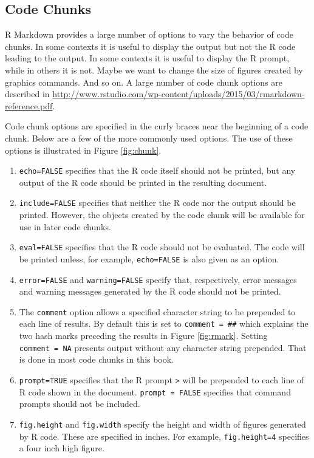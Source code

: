\documentclass[
]{krantz}
\begin{document}
\hypertarget{code-chunks}{%
\subsection{Code Chunks}\label{code-chunks}}

R Markdown provides a large number of options to vary the behavior of code chunks. In some contexts it is useful to display the output but not the R code leading to the output. In some contexts it is useful to display the R prompt, while in others it is not. Maybe we want to change the size of figures created by graphics commands. And so on. A large number of code chunk options are described in \url{http://www.rstudio.com/wp-content/uploads/2015/03/rmarkdown-reference.pdf}.

Code chunk options are specified in the curly braces near the beginning of a code chunk. Below are a few of the more commonly used options. The use of these options is illustrated in Figure \ref{fig:chunk}.

\begin{enumerate}
\def\labelenumi{\arabic{enumi}.}
\item
  \texttt{echo=FALSE} specifies that the R code itself should not be printed, but any output of the R code should be printed in the resulting document.
\item
  \texttt{include=FALSE} specifies that neither the R code nor the output should be printed. However, the objects created by the code chunk will be available for use in later code chunks.
\item
  \texttt{eval=FALSE} specifies that the R code should not be evaluated. The code will be printed unless, for example, \texttt{echo=FALSE} is also given as an option.
\item
  \texttt{error=FALSE} and \texttt{warning=FALSE} specify that, respectively, error messages and warning messages generated by the R code should not be printed.
\item
  The \texttt{comment} option allows a specified character string to be prepended to each line of results. By default this is set to \texttt{comment\ =\ \textquotesingle{}\#\#\textquotesingle{}} which explains the two hash marks preceding the results in Figure \ref{fig:rmark}. Setting \texttt{comment\ =\ NA} presents output without any character string prepended. That is done in most code chunks in this book.
\item
  \texttt{prompt=TRUE} specifies that the R prompt \texttt{\textgreater{}} will be prepended to each line of R code shown in the document. \texttt{prompt\ =\ FALSE} specifies that command prompts should not be included.
\item
  \texttt{fig.height} and \texttt{fig.width} specify the height and width of figures generated by R code. These are specified in inches. For example, \texttt{fig.height=4} specifies a four inch high figure.
\end{enumerate}
\end{document}
